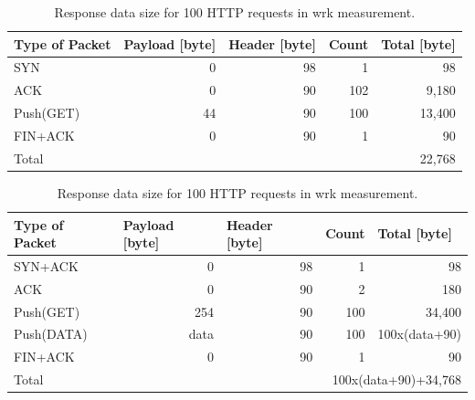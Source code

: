 \begin{table}[h]
\centering
  \begin{tabular}{|l|r|r|r|r|}
    \hline
    Type of Packet & \multicolumn{1}{l|}{Payload {[}byte{]}} & \multicolumn{1}{l|}{Header {[}byte{]}} & \multicolumn{1}{l|}{Count} & \multicolumn{1}{l|}{Total {[}byte{]}} \\ \hline
    SYN & 0 & 98 & 1 & 98 \\ \hline
    ACK & 0 & 90 & 102 & 9,180 \\ \hline
    Push(GET) & 44 & 90 & 100 & 13,400 \\ \hline
    FIN+ACK & 0 & 90 & 1 & 90 \\ \hline
    \multicolumn{3}{|l|}{Total} & \multicolumn{2}{r|}{22,768} \\ \hline
  \end{tabular}
  \caption{Request data size for 100 HTTP requests in wrk measurement.}
  \label{tab:request_data_size}

  \vspace{1cm}
  
\centering
  \begin{tabular}{|l|r|r|r|r|}
    \hline
    Type of Packet & \multicolumn{1}{l|}{Payload {[}byte{]}} & \multicolumn{1}{l|}{Header {[}byte{]}} & \multicolumn{1}{l|}{Count} & \multicolumn{1}{l|}{Total {[}byte{]}} \\ \hline
    SYN+ACK & 0 & 98 & 1 & 98 \\ \hline
    ACK & 0 & 90 & 2 & 180 \\ \hline
    Push(GET) & 254 & 90 & 100 & 34,400 \\ \hline
    Push(DATA) & data & 90 & 100 & 100x(data+90) \\ \hline
    FIN+ACK & 0 & 90 & 1 & 90 \\ \hline
    \multicolumn{3}{|l|}{Total} & \multicolumn{2}{r|}{100x(data+90)+34,768} \\ \hline
  \end{tabular}
  \caption{Response data size for 100 HTTP requests in wrk measurement.}
  \label{tab:response_data_size}
\end{table}

